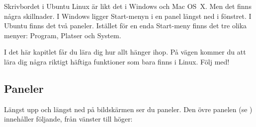 \documentclass[a4paper,final]{memoir} %
\begin{document}


Skrivbordet i Ubuntu Linux är likt det i Windows och Mac OS~X. Men det finns några skillnader. I Windows ligger Start-menyn i en panel längst ned i fönstret. I Ubuntu finns det två paneler. Istället för en enda Start-meny finns det tre olika menyer: Program, Platser och System.

I det här kapitlet får du lära dig hur allt hänger ihop. På vägen kommer du att lära dig några riktigt häftiga funktioner som bara finns i Linux. Följ med!

\subsection{Paneler}

Längst upp och längst ned på bildskärmen ser du paneler. Den övre panelen (se ) innehåller följande, från vänster till höger:
\end{document}
